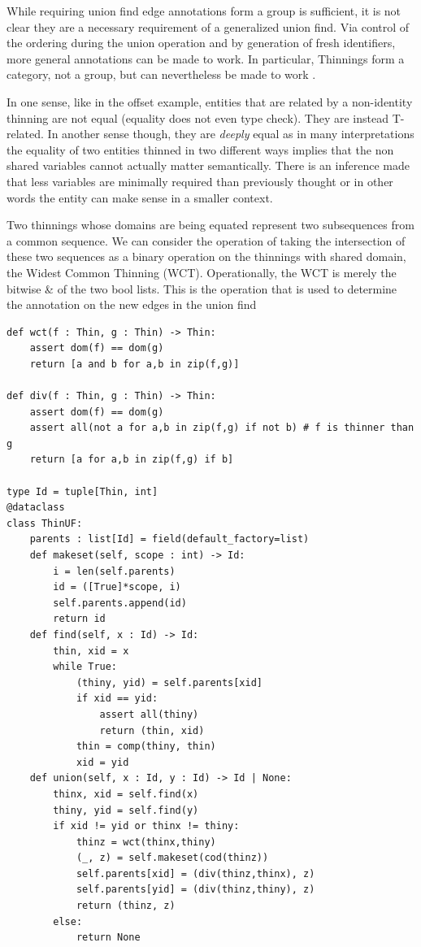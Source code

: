 \documentclass{article}%
\begin{document}
While requiring union find edge annotations form a group is sufficient, it is not clear they are a necessary requirement of a generalized union find. Via control of the ordering during the union operation and by generation of fresh identifiers, more general annotations can be made to work. In particular, Thinnings form a category, not a group, but can nevertheless be made to work \cite{zucker2026monusfactora}. 



In one sense, like in the offset example, entities that are related by a non-identity thinning are not equal (equality does not even type check). They are instead T-related. In another sense though, they are \textit{deeply} equal as in many interpretations the equality of two entities thinned in two different ways implies that the non shared variables cannot actually matter semantically. There is an inference made that less variables are minimally required than previously thought or in other words the entity can make sense in a smaller context.

Two thinnings whose domains are being equated represent two subsequences from a common sequence. We can consider the operation of taking the intersection of these two sequences as a binary operation on the thinnings with shared domain, the Widest Common Thinning (WCT). Operationally, the WCT is merely the bitwise \& of the two bool lists. This is the operation that is used to determine the annotation on the new edges in the union find 

\begin{lstlisting}
def wct(f : Thin, g : Thin) -> Thin:
    assert dom(f) == dom(g)
    return [a and b for a,b in zip(f,g)]

def div(f : Thin, g : Thin) -> Thin:
    assert dom(f) == dom(g)
    assert all(not a for a,b in zip(f,g) if not b) # f is thinner than g
    return [a for a,b in zip(f,g) if b]

type Id = tuple[Thin, int]
@dataclass
class ThinUF:
    parents : list[Id] = field(default_factory=list)
    def makeset(self, scope : int) -> Id:
        i = len(self.parents)
        id = ([True]*scope, i)
        self.parents.append(id)
        return id
    def find(self, x : Id) -> Id:
        thin, xid = x
        while True:
            (thiny, yid) = self.parents[xid]
            if xid == yid:
                assert all(thiny)
                return (thin, xid)
            thin = comp(thiny, thin)
            xid = yid
    def union(self, x : Id, y : Id) -> Id | None:
        thinx, xid = self.find(x)
        thiny, yid = self.find(y)
        if xid != yid or thinx != thiny:
            thinz = wct(thinx,thiny)
            (_, z) = self.makeset(cod(thinz))
            self.parents[xid] = (div(thinz,thinx), z)
            self.parents[yid] = (div(thinz,thiny), z)
            return (thinz, z)
        else:
            return None
\end{lstlisting}
\end{document}
